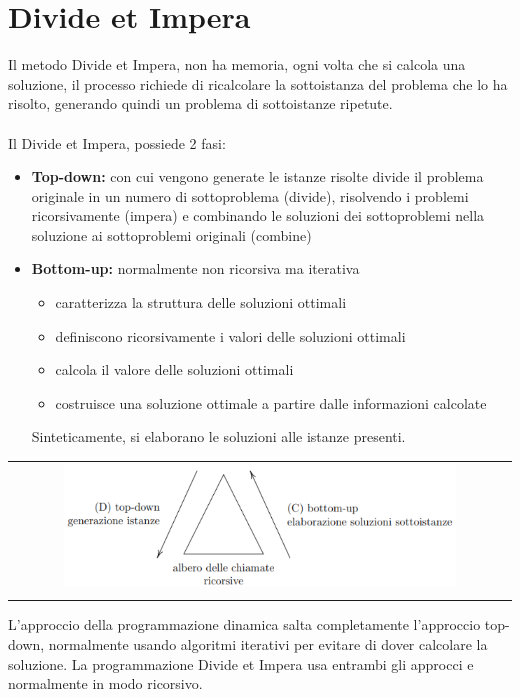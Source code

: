 \section{Divide et Impera}
Il metodo Divide et Impera, non ha memoria, ogni volta che si calcola una soluzione, il processo richiede di ricalcolare la sottoistanza del problema che lo ha risolto, generando quindi un problema di sottoistanze ripetute. \\~\\

Il Divide et Impera, possiede 2 fasi:
\begin{itemize}
    \item \textbf{Top-down:} con cui vengono generate le istanze risolte divide il problema originale in un numero di sottoproblema (divide), risolvendo i problemi ricorsivamente (impera) e combinando le soluzioni dei sottoproblemi nella soluzione ai sottoproblemi originali (combine)
    \item \textbf{Bottom-up:} normalmente non ricorsiva ma iterativa
    \begin{itemize}
        \item caratterizza la struttura delle soluzioni ottimali
        \item definiscono ricorsivamente i valori delle soluzioni ottimali
        \item calcola il valore delle soluzioni ottimali
        \item costruisce una soluzione ottimale a partire dalle informazioni calcolate
    \end{itemize}
    Sinteticamente, si elaborano le soluzioni alle istanze presenti.
\end{itemize}
\begin{center}
    \begin{tabular}{c}
        \\ \includegraphics[width=0.8\textwidth]{image/T-D_B-U.png} \\ \\
    \end{tabular}
\end{center}
L'approccio della programmazione dinamica salta completamente l'approccio top-down, normalmente usando algoritmi iterativi per evitare di dover calcolare la soluzione. La programmazione Divide et Impera usa entrambi gli approcci e normalmente in modo ricorsivo.
